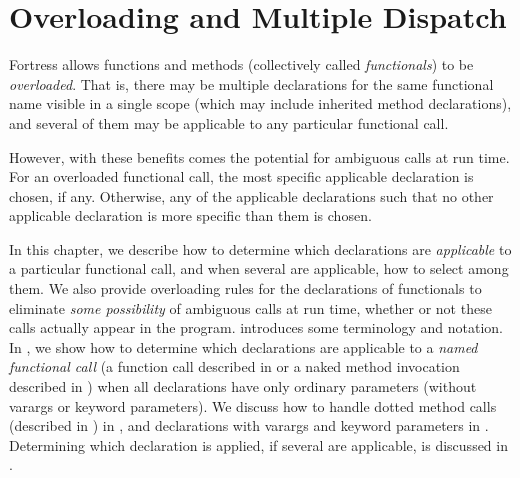 %
%
%
%

\chapter{Overloading and Multiple Dispatch}


Fortress allows functions and methods (collectively called \emph{functionals})
to be \emph{overloaded}.  That is,
there may be multiple declarations for the same functional name
visible in a single scope (which may include inherited method declarations),
and several of them may be applicable to any particular functional call.

However, with these benefits comes the potential for ambiguous calls at run time.
For an overloaded functional call,
the most specific applicable declaration is chosen, if any.
Otherwise, any of the applicable declarations such that
no other applicable declaration is more specific than them is chosen.


In this chapter, we describe how to determine which declarations
are \emph{applicable} to a particular functional call,
and when several are applicable, how to select among them.
We also provide overloading rules for the declarations of functionals
to eliminate \emph{some possibility} of ambiguous calls at run time,
whether or not these calls actually appear in the program.
 introduces some terminology and notation.
In ,
we show how to determine which declarations
are applicable to a \emph{named functional call}
(a function call described in 
or a naked method invocation described in )
when all declarations have only ordinary parameters
(without varargs or keyword
parameters).
We discuss how to handle dotted method calls
(described in )
in ,
and declarations with varargs and keyword
parameters in .
Determining which declaration is applied,
if several are applicable,
is discussed in .


